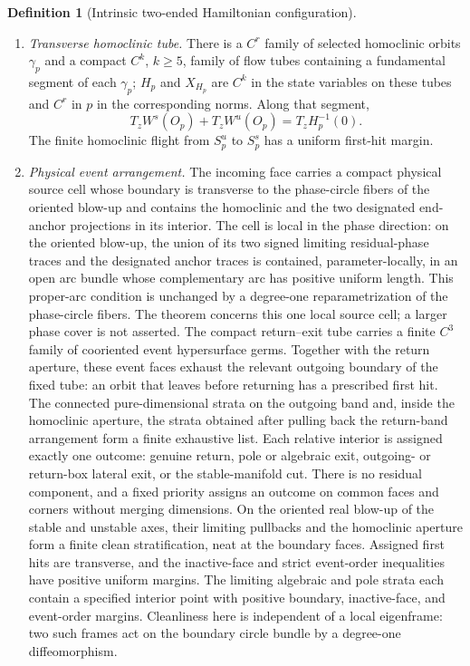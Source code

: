 \documentclass[11pt]{amsart}
\numberwithin{equation}{section}
\theoremstyle{definition}
\newtheorem{definition}[theorem]{Definition}
\theoremstyle{remark}
\begin{document}
\begin{definition}[Intrinsic two-ended Hamiltonian configuration]
\begin{enumerate}
\item \emph{Transverse homoclinic tube.}
There is a $C^r$ family of selected homoclinic orbits $\gamma_p$ and a
compact $C^k$, $k\ge5$, family of flow tubes containing a fundamental
segment of each $\gamma_p$; $H_p$ and $X_{H_p}$ are $C^k$ in the state
variables on these tubes and $C^r$ in $p$ in the corresponding norms.
Along that segment,
\begin{equation}\label{eq:intrinsic-homoclinic-transversality}
 T_zW^s(O_p)+T_zW^u(O_p)=T_zH_p^{-1}(0).
\end{equation}
The finite homoclinic flight from $S^u_p$ to $S^s_p$ has a uniform
first-hit margin.

\item \emph{Physical event arrangement.}
The incoming face carries a compact physical source cell whose boundary is
transverse to the phase-circle fibers of the oriented blow-up and contains
the homoclinic and the two designated end-anchor projections in its
interior.  The cell is local in the phase direction: on the oriented
blow-up, the union of its two signed limiting residual-phase traces and the
designated anchor traces is contained, parameter-locally, in an open arc
bundle whose complementary arc has positive uniform length.  This
proper-arc condition is unchanged by a degree-one reparametrization of the
phase-circle fibers.  The theorem concerns this one local source cell; a
larger phase cover is not asserted.
The compact return--exit tube carries a finite $C^3$ family of cooriented
event hypersurface germs.  Together with the return aperture, these event
faces exhaust the relevant outgoing boundary of the fixed tube: an orbit
that leaves before returning has a prescribed first hit.  The connected
pure-dimensional strata on the outgoing band and, inside the homoclinic
aperture, the strata obtained after pulling back the return-band
arrangement form a finite exhaustive list.  Each relative interior is
assigned exactly one outcome: genuine return, pole or algebraic exit,
outgoing- or return-box lateral exit, or the stable-manifold cut.  There is
no residual component, and a fixed priority assigns an outcome on common
faces and corners without merging dimensions.  On the oriented real
blow-up of the stable and unstable axes, their limiting pullbacks and the homoclinic aperture form a
finite clean stratification, neat at the boundary faces.  Assigned first
hits are transverse, and the inactive-face and strict event-order
inequalities have positive uniform margins.  The limiting algebraic and
pole strata each contain a specified interior point with positive boundary,
inactive-face, and event-order margins.  Cleanliness here is independent of
a local eigenframe: two such frames act on the boundary circle bundle by a
degree-one diffeomorphism.


\end{enumerate}
\end{definition}
\end{document}
